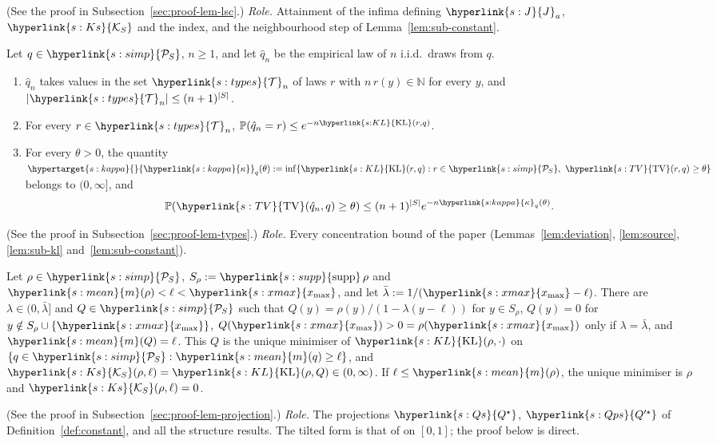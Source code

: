 \documentclass[11pt]{article}
\newcommand{\PP}{\mathbb{P}}
\newcommand{\dt}[1]{\hypertarget{#1}{}}
\newcommand{\sy}[2]{{\hyperlink{#1}{#2}}}
\newcommand{\xmax}{\sy{s:xmax}{x_{\max}}}
\newcommand{\Simp}{\sy{s:simp}{\mathcal{P}_{S}}}
\newcommand{\mean}{\sy{s:mean}{m}}
\newcommand{\supp}{\sy{s:supp}{\mathrm{supp}}}
\newcommand{\KL}{\sy{s:KL}{\mathrm{KL}}}
\newcommand{\TV}{\sy{s:TV}{\mathrm{TV}}}
\newcommand{\Ks}{\sy{s:Ks}{\mathcal{K}_{S}}}
\newcommand{\Jf}{\sy{s:J}{J}}
\newcommand{\Qs}{\sy{s:Qs}{Q^{\star}}}
\newcommand{\Qps}{\sy{s:Qps}{Q'^{\star}}}
\newcommand{\kap}{\sy{s:kappa}{\kappa}}
\newcommand{\Tn}{\sy{s:types}{\mathcal{T}}}
\begin{document}
(See the proof in Subsection~\ref{sec:proof-lem-lsc}.) \emph{Role.} Attainment of the infima
defining $\Jf_a$, $\Ks$ and the index, and the neighbourhood step of Lemma~\ref{lem:sub-constant}.

\begin{lemma}\label{lem:types}
Let $q\in\Simp$, $n\ge1$, and let $\hat q_n$ be the empirical law of $n$ i.i.d.\ draws from $q$.
\begin{enumerate}
\item[(a)] $\hat q_n$ takes values in the set \dt{s:types}$\Tn_n$ of laws $r$ with
  $n\,r(y)\in\mathbb N$ for every $y$, and $|\Tn_n|\le(n+1)^{|S|}$.
\item[(b)] For every $r\in\Tn_n$, $\PP(\hat q_n=r)\le e^{-n\KL(r,q)}$.
\item[(c)] For every $\theta>0$, the quantity
  $\dt{s:kappa}\kap_q(\theta):=\inf\{\KL(r,q):r\in\Simp,\ \TV(r,q)\ge\theta\}$ belongs to
  $(0,\infty]$, and
  \begin{equation*}
  \PP(\TV(\hat q_n,q)\ge\theta)\le(n+1)^{|S|}e^{-n\kap_q(\theta)}.
  \end{equation*}
\end{enumerate}
\end{lemma}

(See the proof in Subsection~\ref{sec:proof-lem-types}.) \emph{Role.} Every concentration bound of
the paper (Lemmas~\ref{lem:deviation}, \ref{lem:source}, \ref{lem:sub-kl}
and~\ref{lem:sub-constant}).

\begin{lemma}[KL projection on $\Simp$]\label{lem:projection}
Let $\rho\in\Simp$, $S_\rho:=\supp\,\rho$ and $\mean(\rho)<\ell<\xmax$, and let
$\bar\lambda:=1/(\xmax-\ell)$. There are $\lambda\in(0,\bar\lambda]$ and $Q\in\Simp$ such that
$Q(y)=\rho(y)/(1-\lambda(y-\ell))$ for $y\in S_\rho$, $Q(y)=0$ for $y\notin S_\rho\cup\{\xmax\}$,
$Q(\xmax)>0=\rho(\xmax)$ only if $\lambda=\bar\lambda$, and $\mean(Q)=\ell$. This $Q$ is the unique
minimiser of $\KL(\rho,\cdot)$ on $\{q\in\Simp:\mean(q)\ge\ell\}$, and
$\Ks(\rho,\ell)=\KL(\rho,Q)\in(0,\infty)$. If $\ell\le \mean(\rho)$, the unique minimiser is $\rho$ and
$\Ks(\rho,\ell)=0$.
\end{lemma}

(See the proof in Subsection~\ref{sec:proof-lem-projection}.) \emph{Role.} The projections $\Qs$,
$\Qps$ of Definition~\ref{def:constant}, and all the structure results. The tilted form is that of
\citet[Theorem~8]{HT10} on $[0,1]$; the proof below is direct.
\end{document}

